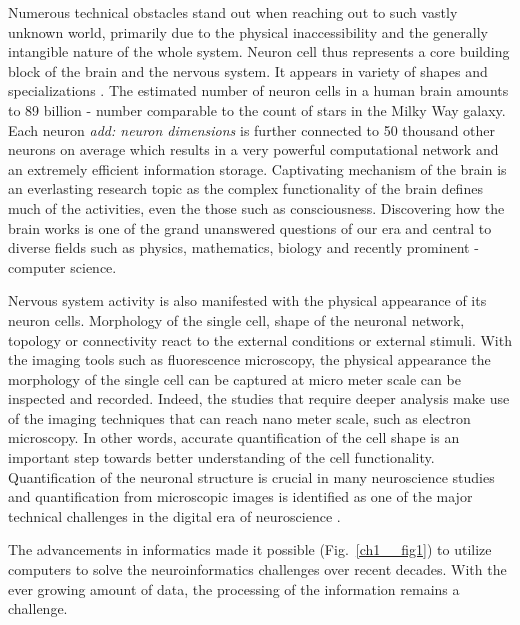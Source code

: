 Numerous technical obstacles stand out when reaching out to such vastly unknown world, primarily due to the physical inaccessibility and the generally intangible nature of the whole system. Neuron cell thus represents a core building block of the brain and the nervous system. It appears in variety of shapes and specializations \cite{ascolitrees}. The estimated number of neuron cells in a human brain amounts to 89 billion \cite{herculano2009human} - number comparable to the count of stars in the Milky Way galaxy. Each neuron \textit{add: neuron dimensions} is further connected to 50 thousand other neurons on average which results in a very powerful computational network and an extremely efficient information storage. Captivating mechanism of the brain is an everlasting research topic as the complex functionality of the brain defines much of the activities, even the those such as consciousness. Discovering how the brain works is one of the grand unanswered questions of our era and central to diverse fields such as physics, mathematics, biology and recently prominent - computer science.

Nervous system activity is also manifested with the physical appearance of its neuron cells. Morphology of the single cell, shape of the neuronal network, topology or connectivity react to the external conditions or external stimuli. With the imaging tools such as fluorescence microscopy, the physical appearance the morphology of the single cell can be captured at micro meter scale can be inspected and recorded. Indeed, the studies that require deeper analysis make use of the imaging techniques that can reach nano meter scale, such as electron microscopy. In other words, accurate quantification of the cell shape is an important step towards better understanding of the cell functionality. Quantification of the neuronal structure is crucial in many neuroscience studies \cite{halavi2012digital} and quantification from microscopic images is identified as one of the major technical challenges in the digital era of neuroscience \cite{peng2015diadem}.

The advancements in informatics made it possible (Fig.~\ref{ch1__fig1}) to utilize computers to solve the neuroinformatics challenges over recent decades. With the ever growing amount of data, the processing of the information remains a challenge.   

